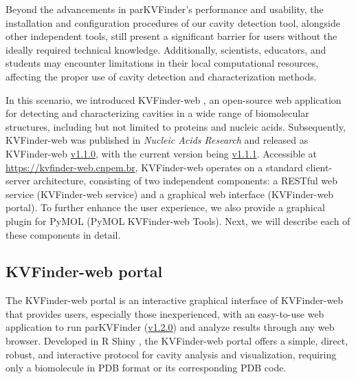 \documentclass[Ingles]{phdthesis}
\begin{document}
Beyond the advancements in parKVFinder's performance and usability, the installation and configuration procedures of our cavity detection tool, alongside other independent tools, still present a significant barrier for users without the ideally required technical knowledge. Additionally, scientists, educators, and students may encounter limitations in their local computational resources, affecting the proper use of cavity detection and characterization methods. 

In this scenario, we introduced KVFinder-web \cite{guerra2023A}, an open-source web application for detecting and characterizing cavities in a wide range of biomolecular structures, including but not limited to proteins and nucleic acids. Subsequently, KVFinder-web was published in \textit{Nucleic Acids Research} \cite{guerra2023A} and released as KVFinder-web \href{https://github.com/LBC-LNBio/KVFinder-web/releases/tag/v1.1.0}{v1.1.0}, with the current version being \href{https://github.com/LBC-LNBio/KVFinder-web/releases/tag/v1.1.1}{v1.1.1}. Accessible at \url{https://kvfinder-web.cnpem.br}, KVFinder-web operates on a standard client-server architecture, consisting of two independent components: a RESTful web service (KVFinder-web service) and a graphical web interface (KVFinder-web portal). To further enhance the user experience, we also provide a graphical plugin for PyMOL (PyMOL KVFinder-web Tools). Next, we will describe each of these components in detail.

\subsection{KVFinder-web portal}

The KVFinder-web portal is an interactive graphical interface of KVFinder-web that provides users, especially those inexperienced, with an easy-to-use web application to run parKVFinder (\href{https://github.com/LBC-LNBio/parKVFinder/releases/tag/v1.2.0}{v1.2.0}) and analyze results through any web browser. Developed in R Shiny \cite{rshiny}, the KVFinder-web portal offers a simple, direct, robust, and interactive protocol for cavity analysis and visualization, requiring only a biomolecule in \acs{PDB} format or its corresponding \acs{PDB} code. 
\end{document}
